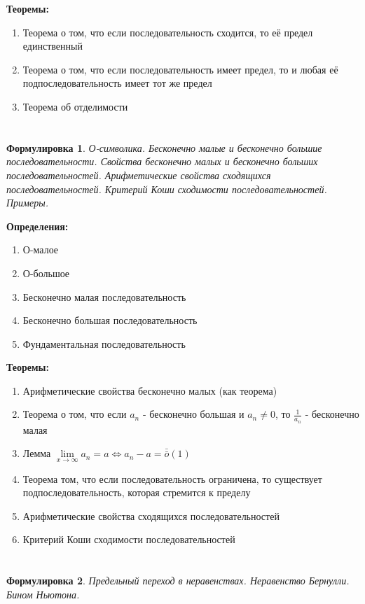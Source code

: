 \documentclass[a4paper]{article}
\newcommand{\om}{\bar{\bar{o}}}
\renewcommand{\liminf}{\lim\limits_{x\to \infty}}
\theoremstyle{plain}
\newtheorem*{st}{Формулировка}
\theoremstyle{definition}
\theoremstyle{remark}
\begin{document}
\textbf{Теоремы:}
\begin{enumerate}
    \item Теорема о том, что если последовательность сходится, то её предел единственный
    \item Теорема о том, что если последовательность имеет предел, то и любая её подпоследовательность имеет тот же предел
    \item Теорема об отделимости
\end{enumerate}


\section{}
\begin{st}
    О-символика. Бесконечно малые и бесконечно большие последовательности. Свойства бесконечно малых и бесконечно больших последовательностей. Арифметические свойства сходящихся последовательностей. Критерий Коши сходимости последовательностей. Примеры.
\end{st}

\textbf{Определения:}
\begin{enumerate}
    \item О-малое
    \item О-большое
    \item Бесконечно малая последовательность
    \item Бесконечно большая последовательность
    \item Фундаментальная последовательность
\end{enumerate}

\textbf{Теоремы:}
\begin{enumerate}
    \item Арифметические свойства бесконечно малых (как теорема)
    \item Теорема о том, что если $a_n$ - бесконечно большая и $a_n \neq 0$, то $\frac{1}{a_n}$ - бесконечно малая
    \item Лемма $\liminf{a_n} = a \Leftrightarrow a_n - a = \om(1)$
    \item Теорема том, что если последовательность ограничена, то существует подпоследовательность, которая стремится к пределу
    \item Арифметические свойства сходящихся последовательностей
    \item Критерий Коши сходимости последовательностей
\end{enumerate}


\section{}
\begin{st}
    Предельный переход в неравенствах. Неравенство Бернулли. Бином Ньютона.
\end{st}
\end{document}
